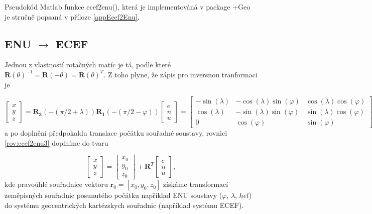 Pseudokód Matlab funkce ecef2enu(), která je implementováná v package +Geo je stručně popsaná v příloze \ref{appEcef2Enu}.


\subsection{ENU $\rightarrow$ ECEF}


Jednou z vlastností rotačných matíc je tá, podle které $\mathbf{R}\left(\theta\right)^{-1} = \mathbf{R}\left(-\theta\right) = \mathbf{R}\left(\theta\right)^{T}$. Z toho plyne, že zápis pro inversnou tranformaci je

\begin{equation}
\begin{bmatrix}
x \\
y \\
z
\end{bmatrix} =
\mathbf{R_{3}}\left(-\left(\pi/2+\lambda\right)\right)\mathbf{R_{1}}\left(-\left(\pi/2-\varphi\right)\right)
\begin{bmatrix}
e \\
n \\
u
\end{bmatrix} = 
\begin{bmatrix}
-\sin{\left(\lambda\right)} & -\cos{\left(\lambda\right)}\sin{\left(\varphi\right)} & \cos{\left(\lambda\right)}\cos{\left(\varphi\right)} \\
 \cos{\left(\lambda\right)} & -\sin{\left(\lambda\right)}\sin{\left(\varphi\right)} & \sin{\left(\lambda\right)}\cos{\left(\varphi\right)} \\
 0  &  \cos{\left(\varphi\right)} & \sin{\left(\varphi\right)} 
\end{bmatrix}
\begin{bmatrix}
e \\
n \\
u
\end{bmatrix}.
\label{rov:ecef2enu3}
\end{equation}
a po doplnění předpokaldu translace počátku souřadné soustavy, rovnici \ref{rov:ecef2enu3} doplníme do tvaru

\begin{equation}
\begin{bmatrix}
x \\
y \\
z
\end{bmatrix} =
\begin{bmatrix}
x_{0} \\
y_{0} \\
z_{0}
\end{bmatrix} + 
\mathbf{R}^{T}
\begin{bmatrix}
e \\
n \\
u
\end{bmatrix},
\label{rov:ecef2enu33}
\end{equation}
kde pravoúhlé souřadnice vektoru $\mathbf{r}_{0}=\left[x_{0}, y_{0}, z_{0} \right]$ získáme transformací zeměpisných souřadnic posunutého počátku například ENU soustavy ($\varphi$, $\lambda$, $hel$) do systému geocentrických kartézskych souřadnic (například systému ECEF).

